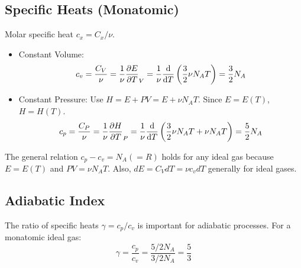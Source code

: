 \documentclass[10pt, letterpaper]{article}
\begin{document}
\subsection{Specific Heats (Monatomic)}
Molar specific heat $c_x = C_x / \nu$.
\begin{itemize}
    \item Constant Volume:
        \begin{equation}
            c_v = \frac{C_V}{\nu} = \frac{1}{\nu} \pdv{E}{T}_{V} = \frac{1}{\nu} \dv{}{T} \left(\frac{3}{2} \nu N_A T\right) = \frac{3}{2} N_A
        \end{equation}
    \item Constant Pressure: Use $H = E + PV = E + \nu N_A T$. Since $E=E(T)$, $H=H(T)$.
        \begin{equation}
            c_p = \frac{C_P}{\nu} = \frac{1}{\nu} \pdv{H}{T}_{P} = \frac{1}{\nu} \dv{}{T} \left(\frac{3}{2} \nu N_A T + \nu N_A T\right) = \frac{5}{2} N_A
        \end{equation}
\end{itemize}
The general relation $c_p - c_v = N_A (=R)$ holds for any ideal gas because $E=E(T)$ and $PV=\nu N_A T$. Also, $dE = C_V dT = \nu c_v dT$ generally for ideal gases.

\subsection{Adiabatic Index}
The ratio of specific heats $\gamma = c_p / c_v$ is important for adiabatic processes.
For a monatomic ideal gas:
\begin{equation}
    \gamma = \frac{c_p}{c_v} = \frac{5/2 N_A}{3/2 N_A} = \frac{5}{3}
\end{equation}
\end{document}
